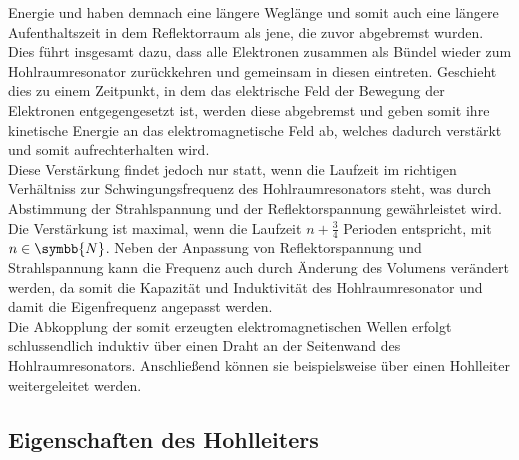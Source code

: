 Energie und haben demnach eine längere Weglänge und somit auch eine längere Aufenthaltszeit in dem Reflektorraum
als jene, die zuvor abgebremst wurden. Dies führt insgesamt dazu, dass alle Elektronen zusammen als
Bündel wieder zum Hohlraumresonator zurückkehren und gemeinsam in diesen eintreten. Geschieht dies zu einem
Zeitpunkt, in dem das elektrische Feld der Bewegung der Elektronen entgegengesetzt ist, werden diese abgebremst
und geben somit ihre kinetische Energie an das elektromagnetische Feld ab, welches dadurch verstärkt und
somit aufrechterhalten wird. \\
Diese Verstärkung findet jedoch nur statt, wenn die Laufzeit im richtigen Verhältniss zur Schwingungsfrequenz des
Hohlraumresonators steht, was durch Abstimmung der Strahlspannung und der Reflektorspannung gewährleistet wird.
Die Verstärkung ist maximal, wenn die Laufzeit $n+\frac{3}{4}$ Perioden entspricht, mit $ n \in \symbb{N}$.
Neben der Anpassung von Reflektorspannung und Strahlspannung kann die Frequenz auch durch Änderung des
Volumens verändert werden, da somit die Kapazität und Induktivität des Hohlraumresonator und damit die
Eigenfrequenz angepasst werden. \\
Die Abkopplung der somit erzeugten elektromagnetischen Wellen erfolgt schlussendlich induktiv über einen Draht an der
Seitenwand des Hohlraumresonators. Anschließend können sie beispielsweise über einen Hohlleiter weitergeleitet werden.


\subsection{Eigenschaften des Hohlleiters}

